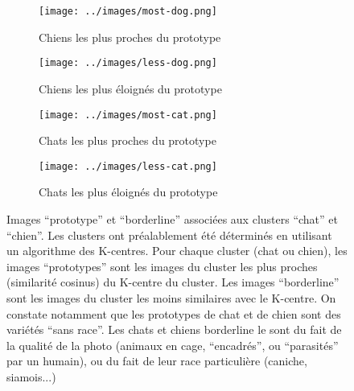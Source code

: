 \documentclass[french]{article}
\begin{document}
	\begin{figure}[H]
		\centering
		\begin{subfigure}[b]{.45\textwidth}
			\centering
			\texttt{[image: ../images/most-dog.png]}
			\caption{Chiens les plus proches du prototype}
		\end{subfigure}
		\begin{subfigure}[b]{.45\textwidth}
		\centering
		\texttt{[image: ../images/less-dog.png]}
		\caption{Chiens les plus éloignés du prototype}
	\end{subfigure}

	\begin{subfigure}[b]{.45\textwidth}
	\centering
	\texttt{[image: ../images/most-cat.png]}
	\caption{Chats les plus proches du prototype}
	\end{subfigure}
	\begin{subfigure}[b]{.45\textwidth}
	\centering
	\texttt{[image: ../images/less-cat.png]}
	\caption{Chats les plus éloignés du prototype}
	\end{subfigure}
	\caption{Images ``prototype'' et ``borderline'' associées aux clusters ``chat'' et ``chien''. Les clusters ont préalablement été déterminés en utilisant un algorithme des K-centres. Pour chaque cluster (chat ou chien), les images ``prototypes'' sont les images du cluster les plus proches (similarité cosinus) du K-centre du cluster. Les images ``borderline'' sont les images du cluster les moins similaires avec le K-centre. On constate notamment que les prototypes de chat et de chien sont des variétés ``sans race''. Les chats et chiens borderline le sont du fait de la qualité de la photo (animaux en cage, ``encadrés'', ou ``parasités'' par un humain), ou du fait de leur race particulière (caniche, siamois...)}
	\label{fig:good_cat}
	\end{figure}
		
		
\end{document}
